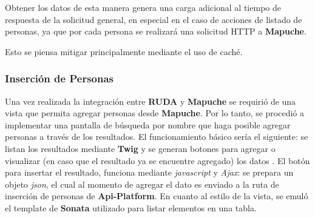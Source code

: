 Obtener los datos de esta manera genera una carga adicional al tiempo de respuesta de la solicitud general, en especial en el caso de acciones de listado de personas, ya que por cada persona se realizará
una solicitud HTTP a \textbf{Mapuche}.

Esto se piensa mitigar principalmente mediante el uso de caché.

\subsubsection{Inserción de Personas}%
\label{ssub:vista_de_inserción}

Una vez realizada la integración entre \textbf{RUDA} y \textbf{Mapuche}
se requirió de una vista que permita agregar personas desde
\textbf{Mapuche}\@. Por lo tanto, se procedió a implementar una pantalla
de búsqueda por nombre que haga posible agregar personas a través de los
resultados\@. El funcionamiento básico sería el siguiente: se listan los
resultados mediante \textbf{Twig} y se generan botones para agregar o
visualizar (en caso que el resultado ya se encuentre agregado) los datos
\@. El botón para insertar el resultado, funciona mediante
\textit{javascript} y \textit{Ajax}: se prepara un objeto \textit{json},
el cual al momento de agregar el dato es enviado a la ruta de inserción
de personas de \textbf{Api-Platform}\@. En cuanto al estilo de la vista,
se emuló el template de \textbf{Sonata} utilizado para listar elementos
en una tabla.
